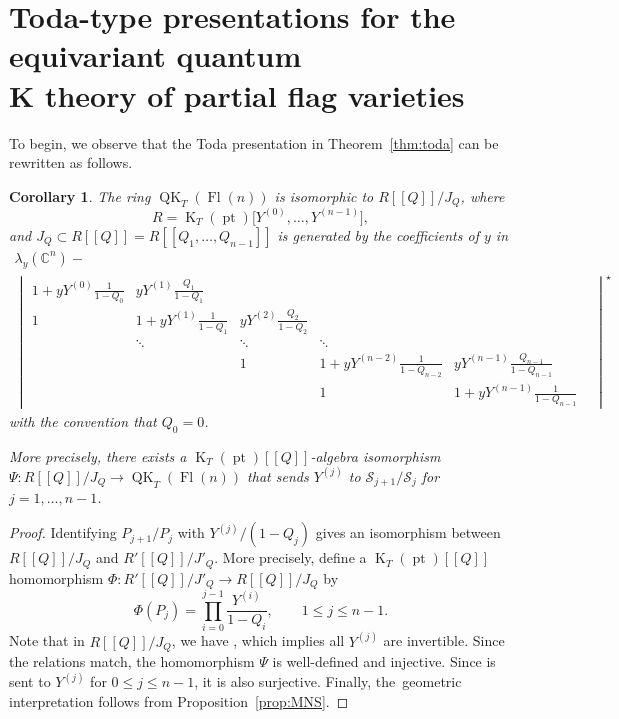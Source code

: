 \documentclass[11pt]{article}
\numberwithin{equation}{section}
\numberwithin{equation}{section}
\newtheorem{Corollary}[Theorem]{Corollary}
\theoremstyle{definition}
\newcommand{\dbb}[1]{[\![#1]\!]}
\DeclareMathOperator{\Fl}{Fl}
\DeclareMathOperator{\QK}{QK}
\DeclareMathOperator{\K}{K}
\DeclareMathOperator{\pt}{pt}
\newcommand{\C}{{\mathbb C}}
\newcommand{\cS}{{\mathcal S}}
\begin{document}
\section[Toda-type presentations for the equivariant quantum K theory of partial flag varieties]{Toda-type presentations for the equivariant quantum\\ K theory of partial flag varieties}%

To begin, we observe that the Toda presentation in Theorem~\ref{thm:toda} can be rewritten as follows.
\begin{Corollary}\label{cor:fln}
 The ring $\QK_T(\Fl(n))$ is isomorphic to $R\dbb{Q}/J_Q$, where
 \[
 R=\K_T(\pt)\bigl[Y^{(0)}, \dots, Y^{(n-1)}\bigr],
 \]
 and $J_Q\subset R\dbb{Q}=R\dbb{Q_1,\dots,Q_{n-1}}$ is generated by the coefficients of $y$ in
 \begin{gather*}%
 \lambda_y(\C^n) - \\
 \begin{vmatrix}
 1+yY^{(0)}\frac{1}{1-Q_0} & yY^{(1)}\frac{Q_1}{1-Q_1} & & & & \\[1mm]
 1 & 1+yY^{(1)}\frac{1}{1-Q_1} & yY^{(2)}\frac{Q_2}{1-Q_2} & & & \\ %
& \ddots & \ddots & \ddots \\ & & 1 & 1+yY^{(n-2)}\frac{1}{1-Q_{n-2}} & yY^{(n-1)}\frac{Q_{n-1}}{1-Q_{n-1}}\\[1mm] & & & 1 & 1+yY^{(n-1)}\frac{1}{1-Q_{n-1}}
\!\!\!\end{vmatrix}^\star
\end{gather*}
with the convention that $Q_0=0$.

More precisely,
there exists a $\K_T(\pt)[\![Q]\!]$-algebra isomorphism $\Psi\colon R[\![Q]\!]/J_Q \to \QK_T(\Fl(n))$ that sends $Y^{(j)}$ to $\cS_{j+1}/\cS_j$ for $j=1,\dots,n-1$.
\end{Corollary}
\begin{proof}
 Identifying $P_{j+1}/P_j$ with $Y^{(j)}/(1-Q_j)$ gives an isomorphism between $R[\![Q]\!]/J_Q$ and $R'[\![Q]\!]/J'_Q$. More precisely, define a $\K_T(\pt)[\![Q]\!]$ homomorphism $\Phi\colon R'[\![Q]\!]/J'_Q\to R[\![Q]\!]/J_Q$ by
\[
 \Phi(P_j)=\prod_{i=0}^{j-1}\frac{Y^{(i)}}{1-Q_i}, \qquad 1\leq j\leq n-1.
\]
Note that in $R[\![Q]\!]/J_Q$, we have \smash{$\det\C^{n}=\prod_{i=0}^{n-1}Y^{(i)}/(1-Q_i)$}, which implies all $Y^{(j)}$ are invertible. Since the relations match, the homomorphism $\Psi$ is well-defined and injective. Since  is sent to $Y^{(j)}$ for $0\leq j\leq n-1$, it is also surjective. Finally, the~geometric interpretation follows from Proposition~\ref{prop:MNS}.
\end{proof}
\end{document}

